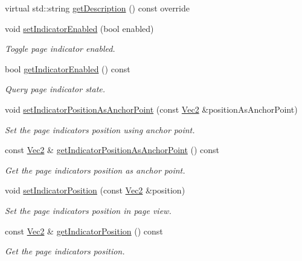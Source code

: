 \begin{DoxyCompactItemize}
virtual std\+::string \hyperlink{classui_1_1PageView_a3c9b2934fdbbb44e2c456feee27b53de}{get\+Description} () const override
\item 
void \hyperlink{classui_1_1PageView_a2fc6399772e0381cd8cfcd3e39aff5f2}{set\+Indicator\+Enabled} (bool enabled)
\begin{DoxyCompactList}\small\item\em Toggle page indicator enabled. \end{DoxyCompactList}\item 
bool \hyperlink{classui_1_1PageView_a15476071cbcf8fc025760426298a2dff}{get\+Indicator\+Enabled} () const
\begin{DoxyCompactList}\small\item\em Query page indicator state. \end{DoxyCompactList}\item 
void \hyperlink{classui_1_1PageView_a72ad43bc3f2aaafc8bfba8244fc9c5bd}{set\+Indicator\+Position\+As\+Anchor\+Point} (const \hyperlink{classVec2}{Vec2} \&position\+As\+Anchor\+Point)
\begin{DoxyCompactList}\small\item\em Set the page indicator\textquotesingle{}s position using anchor point. \end{DoxyCompactList}\item 
const \hyperlink{classVec2}{Vec2} \& \hyperlink{classui_1_1PageView_afd78e6ec197b8aea68614f9f6c35a70d}{get\+Indicator\+Position\+As\+Anchor\+Point} () const
\begin{DoxyCompactList}\small\item\em Get the page indicator\textquotesingle{}s position as anchor point. \end{DoxyCompactList}\item 
void \hyperlink{classui_1_1PageView_abcc7b971a29ec68732a8e30a293b8018}{set\+Indicator\+Position} (const \hyperlink{classVec2}{Vec2} \&position)
\begin{DoxyCompactList}\small\item\em Set the page indicator\textquotesingle{}s position in page view. \end{DoxyCompactList}\item 
const \hyperlink{classVec2}{Vec2} \& \hyperlink{classui_1_1PageView_a7fec50e1db1bfe9583564ccf528c4865}{get\+Indicator\+Position} () const
\begin{DoxyCompactList}\small\item\em Get the page indicator\textquotesingle{}s position. \end{DoxyCompactList}\item 

\end{DoxyCompactItemize}
